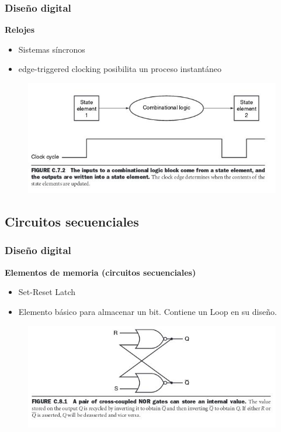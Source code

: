 \documentclass[aspectratio=169,compress]{beamer}
\begin{document}
\begin{footnotesize}
\begin{frame}[fragile]
\frametitle{Diseño digital}
\begin{center}\textbf{Relojes}\end{center}
\begin{itemize}
\item Sistemas síncronos
\item edge-triggered clocking posibilita un proceso instantáneo
\end{itemize}
\begin{figure}
\includegraphics[scale=0.4]{images/reloj-estado-combinacional.jpg} 
\end{figure}
\end{frame}


\subsection{Circuitos secuenciales}

\begin{frame}[fragile]
\frametitle{Diseño digital}
\begin{center}\textbf{Elementos de memoria (circuitos secuenciales)}\end{center}
\begin{itemize}
\item Set-Reset Latch
\item Elemento básico para almacenar un bit. Contiene un Loop en su diseño.
\end{itemize}
\begin{figure}
\includegraphics[scale=0.4]{images/latch-s-r.jpg} 
\end{figure}
\end{frame}


\end{footnotesize}
\end{document}
